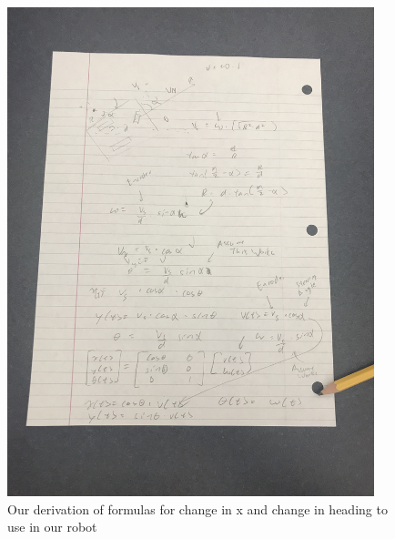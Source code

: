 \begin{figure}[htp]
\centering
\includegraphics[width=0.95\textwidth, angle=0]{Meetings/January/01-10-22/1.11.22 paper derivation - James Hu.JPG}
\caption{Our derivation of formulas for change in x and change in heading to use in our robot}
\label{fig:011022_3}
\end{figure}


